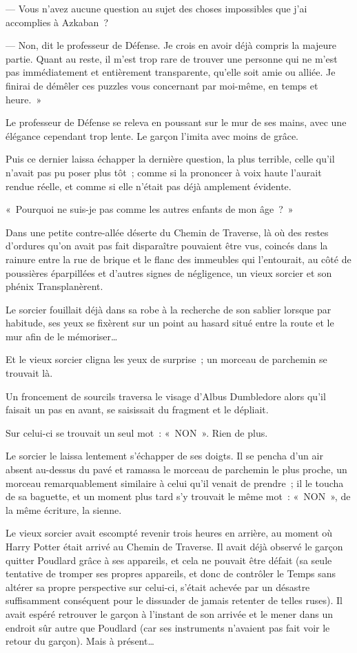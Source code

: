 --- Vous n'avez aucune question au sujet des choses impossibles que j'ai accomplies à Azkaban~?

--- Non, dit le professeur de Défense.
Je crois en avoir déjà compris la majeure partie.
Quant au reste, il m'est trop rare de trouver une personne qui ne m'est pas immédiatement et entièrement transparente, qu'elle soit amie ou alliée.
Je finirai de démêler ces puzzles vous concernant par moi-même, en temps et heure.~»

Le professeur de Défense se releva en poussant sur le mur de ses mains, avec une élégance cependant trop lente.
Le garçon l'imita avec moins de grâce.

Puis ce dernier laissa échapper la dernière question, la plus terrible, celle qu'il n'avait pas pu poser plus tôt~; comme si la prononcer à voix haute l'aurait rendue réelle, et comme si elle n'était pas déjà amplement évidente.

«~Pourquoi ne suis-je pas comme les autres enfants de mon âge~?~»

\later

Dans une petite contre-allée déserte du Chemin de Traverse, là où des restes d'ordures qu'on avait pas fait disparaître pouvaient être vus, coincés dans la rainure entre la rue de brique et le flanc des immeubles qui l'entourait, au côté de poussières éparpillées et d'autres signes de négligence, un vieux sorcier et son phénix Transplanèrent.

Le sorcier fouillait déjà dans sa robe à la recherche de son sablier lorsque par habitude, ses yeux se fixèrent sur un point au hasard situé entre la route et le mur afin de le mémoriser…

Et le vieux sorcier cligna les yeux de surprise~; un morceau de parchemin se trouvait là.

Un froncement de sourcils traversa le visage d'Albus Dumbledore alors qu'il faisait un pas en avant, se saisissait du fragment et le dépliait.

Sur celui-ci se trouvait un seul mot~: «~NON~».
Rien de plus.

Le sorcier le laissa lentement s'échapper de ses doigts.
Il se pencha d'un air absent au-dessus du pavé et ramassa le morceau de parchemin le plus proche, un morceau remarquablement similaire à celui qu'il venait de prendre~; il le toucha de sa baguette, et un moment plus tard s'y trouvait le même mot~: «~NON~», de la même écriture, la sienne.

Le vieux sorcier avait escompté revenir trois heures en arrière, au moment où Harry Potter était arrivé au Chemin de Traverse.
Il avait déjà observé le garçon quitter Poudlard grâce à ses appareils, et cela ne pouvait être défait (sa seule tentative de tromper ses propres appareils, et donc de contrôler le Temps sans altérer sa propre perspective sur celui-ci, s'était achevée par un désastre suffisamment conséquent pour le dissuader de jamais retenter de telles ruses).
Il avait espéré retrouver le garçon à l'instant de son arrivée et le mener dans un endroit sûr autre que Poudlard (car ses instruments n'avaient pas fait voir le retour du garçon).
Mais à présent…


